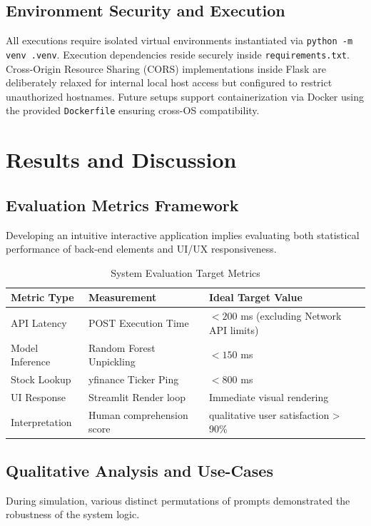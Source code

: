 \documentclass[12pt,a4paper]{report}
\begin{document}
\section{Environment Security and Execution}
All executions require isolated virtual environments instantiated via \texttt{python -m venv .venv}. Execution dependencies reside securely inside \texttt{requirements.txt}. Cross-Origin Resource Sharing (CORS) implementations inside Flask are deliberately relaxed for internal local host access but configured to restrict unauthorized hostnames. Future setups support containerization via Docker using the provided \texttt{Dockerfile} ensuring cross-OS compatibility.

\chapter{Results and Discussion}

\section{Evaluation Metrics Framework}
Developing an intuitive interactive application implies evaluating both statistical performance of back-end elements and UI/UX responsiveness.
\begin{table}[h]
\centering
\begin{tabular}{|l|l|p{6cm}|}
\hline
\textbf{Metric Type} & \textbf{Measurement} & \textbf{Ideal Target Value} \\
\hline
API Latency & POST Execution Time & $< 200$ ms (excluding Network API limits) \\
\hline
Model Inference & Random Forest Unpickling & $< 150$ ms \\
\hline
Stock Lookup & yfinance Ticker Ping & $< 800$ ms \\
\hline
UI Response & Streamlit Render loop & Immediate visual rendering \\
\hline
Interpretation & Human comprehension score & qualitative user satisfaction > 90\% \\
\hline
\end{tabular}
\caption{System Evaluation Target Metrics}
\label{tab:metrics}
\end{table}

\section{Qualitative Analysis and Use-Cases}
During simulation, various distinct permutations of prompts demonstrated the robustness of the system logic.
\end{document}
